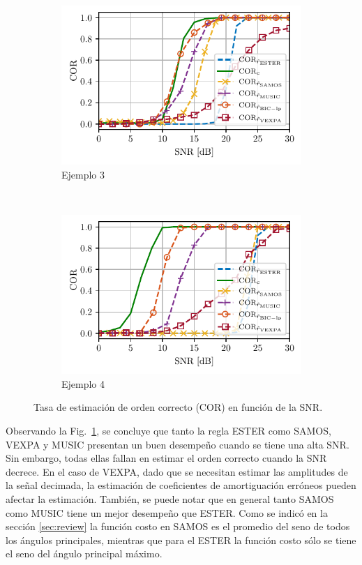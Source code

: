 \begin{figure}[t]
	\begin{subfigure}[b]{0.5\linewidth}
		\includegraphics[width = \linewidth]{Figuras/COR_example_3_vexpa.pdf}
		\caption{Ejemplo 3}
	\end{subfigure}
	~
	\begin{subfigure}[b]{0.5\linewidth}
		\includegraphics[width = \linewidth]{Figuras/COR_example_4_vexpa.pdf}
		\caption{Ejemplo 4}
	\end{subfigure}
	\caption{Tasa de estimación de orden correcto ($\mathrm{COR}$) en función de la SNR.}
	\label{fig:rates}
\end{figure}
\newpage
Observando la Fig.~\ref{fig:rates}, se concluye que tanto la regla ESTER como SAMOS, VEXPA y MUSIC presentan un buen desempeño cuando se tiene una alta SNR. Sin embargo, todas ellas fallan en estimar el orden correcto cuando la SNR decrece. En el caso de VEXPA, dado que se necesitan estimar las amplitudes de la señal decimada, la estimación de coeficientes de amortiguación erróneos pueden afectar la estimación. También, se puede notar que en general tanto SAMOS como MUSIC tiene un mejor desempeño que ESTER. Como se indicó en la sección \ref{sec:review} la función costo en SAMOS es el promedio del seno de todos los ángulos principales, mientras que para el ESTER la función costo sólo se tiene el seno del ángulo principal máximo.
\newpage

